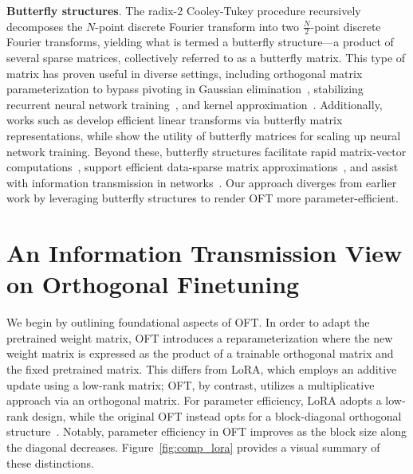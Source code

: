\textbf{Butterfly structures}. The radix-2 Cooley-Tukey procedure recursively decomposes the $N$-point discrete Fourier transform into two $\frac{N}{2}$-point discrete Fourier transforms, yielding what is termed a butterfly structure—a product of several sparse matrices, collectively referred to as a butterfly matrix. This type of matrix has proven useful in diverse settings, including orthogonal matrix parameterization to bypass pivoting in Gaussian elimination~\cite{parker1995random}, stabilizing recurrent neural network training~\cite{jing2017tunable}, and kernel approximation~\cite{munkhoeva2018quadrature}. Additionally, works such as \cite{dao2019learning,dao2019kaleidoscope} develop efficient linear transforms via butterfly matrix representations, while \cite{chen2022pixelated,dao2022monarch} show the utility of butterfly matrices for scaling up neural network training. Beyond these, butterfly structures facilitate rapid matrix-vector computations~\cite{michielssen1996multilevel,o2010algorithm}, support efficient data-sparse matrix approximations~\cite{li2015butterfly}, and assist with information transmission in networks~\cite{klasing1994broadcasting,li2003linear,rajasingh2016transmission}. Our approach diverges from earlier work by leveraging butterfly structures to render OFT more parameter-efficient.

\section{An Information Transmission View on Orthogonal Finetuning}

We begin by outlining foundational aspects of OFT. In order to adapt the pretrained weight matrix, OFT introduces a reparameterization where the new weight matrix is expressed as the product of a trainable orthogonal matrix and the fixed pretrained matrix. This differs from LoRA, which employs an additive update using a low-rank matrix; OFT, by contrast, utilizes a multiplicative approach via an orthogonal matrix. For parameter efficiency, LoRA adopts a low-rank design, while the original OFT instead opts for a block-diagonal orthogonal structure~\cite{qiu2023controlling}. Notably, parameter efficiency in OFT improves as the block size along the diagonal decreases. Figure~\ref{fig:comp_lora} provides a visual summary of these distinctions. 

